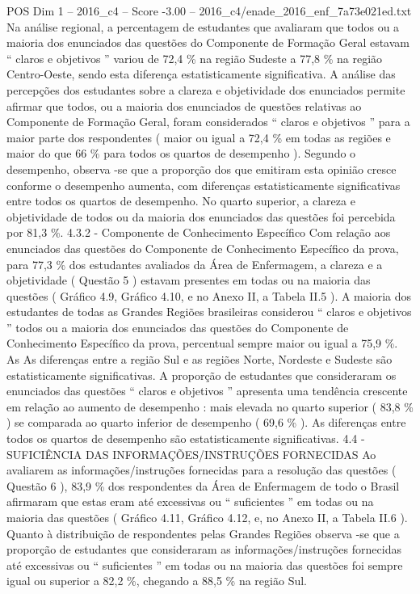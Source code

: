 \begin{textsample}{POS Dim 1 – 2016\_c4 – Score -3.00 – 2016\_c4/enade\_2016\_enf\_7a73e021ed.txt}
Na análise regional, a percentagem de estudantes que avaliaram que todos ou a maioria dos enunciados das questões do Componente de Formação Geral estavam “ claros e objetivos ” variou de 72,4 \% na região Sudeste a 77,8 \% na região Centro-Oeste, sendo esta diferença estatisticamente significativa.
A análise das percepções dos estudantes sobre a clareza e objetividade dos enunciados permite afirmar que todos, ou a maioria dos enunciados de questões relativas ao Componente de Formação Geral, foram considerados “ claros e objetivos ” para a maior parte dos respondentes ( maior ou igual a 72,4 \% em todas as regiões e maior do que 66 \% para todos os quartos de desempenho ).
Segundo o desempenho, observa -se que a proporção dos que emitiram esta opinião cresce conforme o desempenho aumenta, com diferenças estatisticamente significativas entre todos os quartos de desempenho.
No quarto superior, a clareza e objetividade de todos ou da maioria dos enunciados das questões foi percebida por 81,3 \%. 4.3.2 - Componente de Conhecimento Específico Com relação aos enunciados das questões do Componente de Conhecimento Específico da prova, para 77,3 \% dos estudantes avaliados da Área de Enfermagem, a clareza e a objetividade ( Questão 5 ) estavam presentes em todas ou na maioria das questões ( Gráfico 4.9, Gráfico 4.10, e no Anexo II, a Tabela II.5 ).
A maioria dos estudantes de todas as Grandes Regiões brasileiras considerou “ claros e objetivos ” todos ou a maioria dos enunciados das questões do Componente de Conhecimento Específico da prova, percentual sempre maior ou igual a 75,9 \%.
As As diferenças entre a região Sul e as regiões Norte, Nordeste e Sudeste são estatisticamente significativas.
A proporção de estudantes que consideraram os enunciados das questões “ claros e objetivos ” apresenta uma tendência crescente em relação ao aumento de desempenho : mais elevada no quarto superior ( 83,8 \% ) se comparada ao quarto inferior de desempenho ( 69,6 \% ).
As diferenças entre todos os quartos de desempenho são estatisticamente significativas. 4.4 - SUFICIÊNCIA DAS INFORMAÇÕES/INSTRUÇÕES FORNECIDAS Ao avaliarem as informações/instruções fornecidas para a resolução das questões ( Questão 6 ), 83,9 \% dos respondentes da Área de Enfermagem de todo o Brasil afirmaram que estas eram até excessivas ou “ suficientes ” em todas ou na maioria das questões ( Gráfico 4.11, Gráfico 4.12, e, no Anexo II, a Tabela II.6 ).
Quanto à distribuição de respondentes pelas Grandes Regiões observa -se que a proporção de estudantes que consideraram as informações/instruções fornecidas até excessivas ou “ suficientes ” em todas ou na maioria das questões foi sempre igual ou superior a 82,2 \%, chegando a 88,5 \% na região Sul.

\end{textsample}
